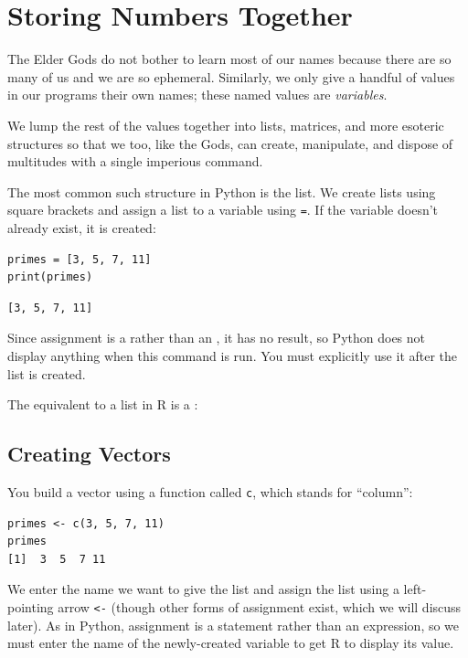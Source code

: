 \section{Storing Numbers Together}

The Elder Gods do not bother to learn most of our names
because there are so many of us and we are so ephemeral.
Similarly, we only give a handful of values in our programs their own names; these named values are \emph{variables}.

We lump the rest of the values together into lists, matrices, and more esoteric structures
so that we too, like the Gods, can create, manipulate, and dispose of multitudes with a single imperious command.

The most common such structure in Python is the list.
We create lists using square brackets
and assign a list to a variable using \texttt{=}.
If the variable doesn't already exist, it is created:

\begin{lstlisting}
primes = [3, 5, 7, 11]
print(primes)
\end{lstlisting}

\begin{lstlisting}
[3, 5, 7, 11]
\end{lstlisting}

Since assignment is a 
rather than an ,
it has no result,
so Python does not display anything when this command is run. You must explicitly use it after the list is created.

The equivalent to a list  in R is  a :

\subsection{Creating Vectors}

You build a vector using a function called \texttt{c},
which stands for ``column'':

\begin{lstlisting}
primes <- c(3, 5, 7, 11)
primes
[1]  3  5  7 11
\end{lstlisting}

We enter the name we want to give the list and assign the list using a left-pointing arrow \texttt{\textless{}-}
(though other forms of assignment exist, which we will discuss later).
As in Python,
assignment is a statement rather than an expression,
so we must enter the name of the newly-created variable to get R to display its value.

